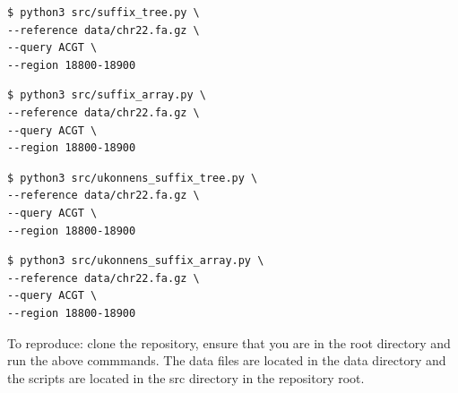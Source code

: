 \documentclass[11pt, letterpaper]{article}
\begin{document}
\begin{verbatim}
$ python3 src/suffix_tree.py \
--reference data/chr22.fa.gz \
--query ACGT \
--region 18800-18900
\end{verbatim}

\begin{verbatim}
$ python3 src/suffix_array.py \
--reference data/chr22.fa.gz \
--query ACGT \
--region 18800-18900
\end{verbatim}

\begin{verbatim}
$ python3 src/ukonnens_suffix_tree.py \
--reference data/chr22.fa.gz \
--query ACGT \
--region 18800-18900
\end{verbatim}

\begin{verbatim}
$ python3 src/ukonnens_suffix_array.py \
--reference data/chr22.fa.gz \
--query ACGT \
--region 18800-18900
\end{verbatim}

To reproduce: clone the repository, 
ensure that you are in the root directory and run the above commmands.
The data files are located in the data directory
and the scripts are located in the src directory
in the repository root.
\end{document}
